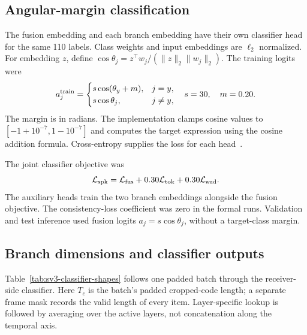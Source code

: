 \subsection{Angular-margin classification}
The fusion embedding and each branch embedding have their own classifier head for the same 110 labels. Class weights and input embeddings are $\ell_2$ normalized. For embedding $z$, define $\cos\theta_j=z^\top w_j/(\|z\|_2\|w_j\|_2)$. The training logits were
\begin{equation}
 a_j^{\rm train}=
 \begin{cases}
 s\cos(\theta_y+m), & j=y,\\
 s\cos\theta_j, & j\ne y,
 \end{cases}
 \quad s=30,\quad m=0.20.
 \label{eq:sv2-aam}
\end{equation}
The margin is in radians. The implementation clamps cosine values to $[-1+10^{-7},1-10^{-7}]$ and computes the target expression using the cosine addition formula. Cross-entropy supplies the loss for each head~\cite{arcface}.

The joint classifier objective was
\begin{equation}
 \mathcal L_{\rm spk}
 =\mathcal L_{\rm fus}
  +0.30\mathcal L_{\rm tok}
  +0.30\mathcal L_{\rm aud}.
 \label{eq:sv2-spkloss}
\end{equation}
The auxiliary heads train the two branch embeddings alongside the fusion objective. The consistency-loss coefficient was zero in the formal runs. Validation and test inference used fusion logits $a_j=s\cos\theta_j$, without a target-class margin.

\subsection{Branch dimensions and classifier outputs}
Table~\ref{tab:sv3-classifier-shapes} follows one padded batch through the receiver-side classifier. Here $T_c$ is the batch's padded cropped-code length; a separate frame mask records the valid length of every item. Layer-specific lookup is followed by averaging over the active layers, not concatenation along the temporal axis.

